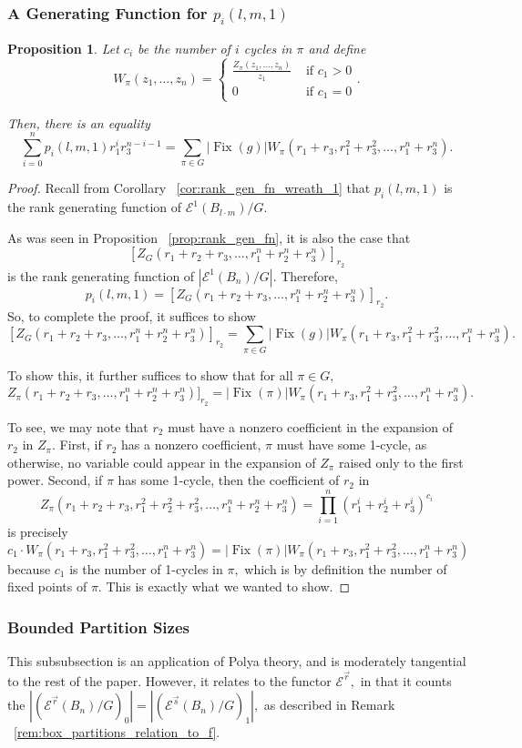\documentclass[10 pt]{amsart}
\theoremstyle{plain}
\newtheorem{prop}[thm]{Proposition}
\theoremstyle{definition}
\theoremstyle{remark}
\numberwithin{equation}{section}
\newcommand\sssec{\subsubsection}
\renewcommand{\vec}[1]{\overrightarrow{#1}}
\def\Fix{\operatorname{Fix}}
\begin{document}
\sssec{A Generating Function for $p_i(l,m,1)$}

\begin{prop}
Let $c_i$ be the number of $i$ cycles in $\pi$ and define $$W_\pi(z_1,\ldots, z_n) = \begin{cases}\frac {Z_\pi(z_1,\ldots,z_n)}{z_1} &\text{ if } c_1 > 0 \\
0 &\text{ if } c_1 = 0
\end{cases}.$$

Then, there is an equality
$$\sum_{i=0}^n p_i(l,m,1) r_1^ir_3^{n-i-1} = \sum_{\pi \in G} |\Fix(g)|W_\pi(r_1 + r_3,r_1^2+r_3^2,\ldots,r_1^n + r_3^n).$$
\end{prop}
\begin{proof}
Recall from Corollary ~\ref{cor:rank_gen_fn_wreath_1} that $p_i(l,m,1)$ is the rank generating function of \linebreak $\mathcal E^1(B_{l\cdot m})/G$. 

As was seen in Proposition ~\ref{prop:rank_gen_fn}, it is also the case that $$[Z_G(r_1+r_2+r_3,\ldots, r_1^n+r_2^n+r_3^n)]_{r_2}$$ is the rank generating function of $|\mathcal E^{1}(B_n)/G|.$
Therefore, 
$$p_i(l,m,1)=[Z_G(r_1+r_2 + r_3,\ldots, r_1^n+ r_2^n + r_3^n)]_{r_2}.$$
So, to complete the proof, it suffices to show
$$[Z_G(r_1+r_2 + r_3,\ldots, r_1^n+ r_2^n + r_3^n)]_{r_2} = \sum_{\pi \in G} |\Fix(g)|W_\pi(r_1 + r_3,r_1^2+r_3^2,\ldots,r_1^n + r_3^n).$$

To show this, it further suffices to show that for all $\pi \in G,$
$$Z_\pi(r_1+r_2 + r_3,\ldots, r_1^n+ r_2^n + r_3^n)]_{r_2} =  |\Fix(\pi)|W_\pi(r_1 + r_3,r_1^2+r_3^2,\ldots,r_1^n + r_3^n).$$

To see, we may note that $r_2$ must have a nonzero coefficient in the expansion of $r_2$ in $Z_\pi.$ First, if $r_2$ has a nonzero coefficient, $\pi$ must have some 1-cycle, as otherwise, no variable could appear in the expansion of $Z_\pi$ raised only to the first power. Second, if $\pi$ has some 1-cycle, then the coefficient of $r_2$ in $$Z_\pi(r_1 + r_2+r_3,r_1^2+r_2^2+r_3^2,\ldots,r_1^n + r_2^n+r_3^n) = \prod_{i=1}^n (r_1^i+r_2^i+r_3^i)^{c_i}$$ is precisely 
$$c_1 \cdot W_\pi(r_1 + r_3,r_1^2+r_3^2,\ldots,r_1^n + r_3^n) = |\Fix(\pi)|W_\pi(r_1 + r_3,r_1^2+r_3^2,\ldots,r_1^n + r_3^n)$$ because $c_1$ is the number of 1-cycles in $\pi,$ which is by definition the number of fixed points of $\pi.$ This is exactly what we wanted to show.
\end{proof}

\sssec{Bounded Partition Sizes}
This subsubsection is an application of Polya theory, and is moderately tangential to the rest of the paper. However, it relates to the functor $\mathcal E^{\vec r},$ in that it counts the $|(\mathcal E^{\vec r}(B_n)/G)_0| =  |(\mathcal E^{\vec s}(B_n)/G)_1|,$ as described in Remark ~\ref{rem:box_partitions_relation_to_f}.
\end{document}
